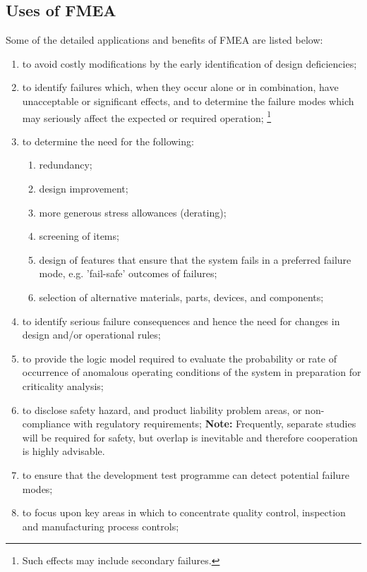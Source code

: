 \documentclass[./dissertation.tex]{subfiles}
\begin{document}
\subsection{Uses of FMEA}

Some of the detailed applications and benefits of FMEA are listed below:

\begin{enumerate}
\item[(a)] to avoid costly modifications by the early identification of design deficiencies;
\item[(b)] to identify failures which, when they occur alone or in combination, have unacceptable or significant effects, and to determine the failure modes which may seriously affect the expected or required operation; \footnote{Such effects may include secondary failures.}
\item[(c)] to determine the need for the following:
\begin{enumerate}
\item[(1)] redundancy;
\item[(2)] design improvement;
\item[(3)] more generous stress allowances (derating);
\item[(4)] screening of items;
\item[(5)] design of features that ensure that the system fails in a preferred failure mode, e.g. 'fail-safe' outcomes of failures;
\item[(6)] selection of alternative materials, parts, devices, and components;
\end{enumerate}
\item[(d)] to identify serious failure consequences and hence the need for changes in design and/or operational rules;
\item[(e)] to provide the logic model required to evaluate the probability or rate of occurrence of anomalous operating conditions of the system in preparation for criticality analysis;
\item[(f)] to disclose safety hazard, and product liability problem areas, or non-compliance with regulatory requirements; \textbf{Note:} Frequently, separate studies will be required for safety, but overlap is inevitable and therefore cooperation is highly advisable.
\item[(g)] to ensure that the development test programme can detect potential failure modes;
\item[(h)] to focus upon key areas in which to concentrate quality control, inspection and manufacturing process controls;

\end{enumerate}
\end{document}
